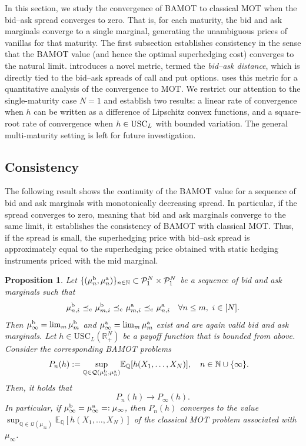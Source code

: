 \documentclass[11pt]{article}
\newcommand{\cP}{\mathcal{P}}
\newcommand{\cQ}{\mathcal{Q}}
\newcommand{\R}{\mathbb{R}} %
\newcommand{\Q}{\mathbb{Q}} %
\newcommand{\N}{\mathbb{N}} %
\theoremstyle{plain}
\newtheorem{proposition}[theorem]{Proposition}
\theoremstyle{definition}
\theoremstyle{remark}
\newcommand{\E}{\mathbb{E}}
\DeclareMathOperator{\cleq}{\,\preceq_{\rm c}\,}
\theoremstyle{plain}
\begin{document}
In this section, we study the convergence of BAMOT to classical MOT when the bid--ask spread converges to zero. That is, for each maturity, the bid and ask marginals converge to a single marginal, generating the unambiguous prices of vanillas for that maturity. The first subsection establishes consistency in the sense that the BAMOT value (and hence the optimal superhedging cost) converges to the natural limit.  introduces a novel metric, termed the \emph{bid--ask distance}, which is directly tied to the bid--ask spreads of call and put options.  uses this metric for a quantitative analysis of the convergence to MOT. We restrict our attention to the single-maturity case $N=1$ and establish two results: a linear rate of convergence when $h$ can be written as a difference of Lipschitz convex functions, and a square-root rate of convergence when $h \in {\rm USC}_L$ with bounded variation. The general multi-maturity setting is left for future investigation.

\subsection{Consistency}

The following result shows the continuity of the BAMOT value for a sequence of bid and ask marginals with monotonically decreasing spread. In particular, if the spread converges to zero, meaning that bid and ask marginals converge to the same limit, it establishes the consistency of BAMOT with classical MOT. Thus, if the spread is small, the superhedging price with bid--ask spread is approximately equal to the superhedging price obtained with static hedging instruments priced with the mid marginal.

\begin{proposition}\label{prop:consistency}
%
%
%
%
%
%
%
%
%
%
%
%
%
%
Let $\{(\mu_n^{\rm b}, \mu_n^{\rm a})\}_{n\in \N} \subset \cP_1^N\times \cP_1^N$ be a sequence of bid and ask marginals such that
    $$\mu_{n,i}^{\rm b} \cleq \mu_{m,i}^{\rm b} \cleq \mu_{m,i}^{\rm a} \cleq \mu_{n,i}^{\rm a}\quad \forall n\leq m, \ i\in [N].$$
    Then $\mu_{\infty}^{\rm b}=\lim_m\mu_{m}^{\rm b}$ and $\mu_{\infty}^{\rm a}=\lim_m\mu_{m}^{\rm a}$ exist and are again valid bid and ask marginals. Let $h\in \text{USC}_L(\R^N_+)$ be a payoff function that is bounded from above. Consider the corresponding BAMOT problems
\begin{equation*}%
    \begin{aligned}
            P_n(h):=\sup_{\Q \in \cQ(\mu^{\rm b}_n, \mu^{\rm a}_n)} &\E_\Q[h(X_1, \ldots, X_N)], \quad n\in\N\cup\{\infty\}.
\end{aligned}
\end{equation*}
Then, it holds that
$$
  P_n(h) \to P_\infty(h).
$$
In particular, if $\mu_\infty^{\rm b}=\mu_\infty^{\rm a}=:\mu_\infty$, then $P_n(h)$ converges to the value $\sup_{\Q \in \cQ(\mu_\infty)} \E_\Q[h(X_1, \ldots, X_N)]$ of the classical MOT problem associated with~$\mu_\infty$. 
\end{proposition}
\end{document}
